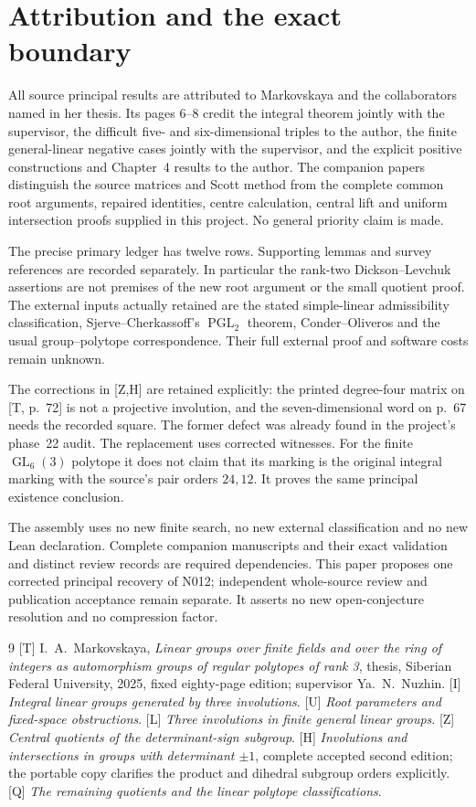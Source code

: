 \documentclass[11pt,a4paper]{article}
\newcommand{\GL}{\operatorname{GL}}
\newcommand{\PGL}{\operatorname{PGL}}
\begin{document}
\section{Attribution and the exact boundary}
All source principal results are attributed to Markovskaya and the
collaborators named in her thesis. Its pages 6--8 credit the integral
theorem jointly with the supervisor, the difficult five- and
six-dimensional triples to the author, the finite general-linear
negative cases jointly with the supervisor, and the explicit
positive constructions and Chapter~4 results to the author.
The companion papers distinguish the source matrices and Scott
method from the complete common root arguments, repaired identities,
centre calculation, central lift and uniform intersection proofs
supplied in this project. No general priority claim is made.

The precise primary ledger has twelve rows. Supporting lemmas and
survey references are recorded separately. In particular the
rank-two Dickson--Levchuk assertions are not premises of the new
root argument or the small quotient proof. The external inputs
actually retained are the stated simple-linear admissibility
classification, Sjerve--Cherkassoff's $\PGL_2$ theorem,
Conder--Oliveros and the usual group--polytope correspondence.
Their full external proof and software costs remain unknown.

The corrections in [Z,H] are retained explicitly: the printed
degree-four matrix on [T, p.~72] is not a projective involution,
and the seven-dimensional word on p.~67 needs the recorded square.
The former defect was already found in the project's phase~22
audit. The replacement uses corrected witnesses. For the finite
$\GL_6(3)$ polytope it does not claim that its marking is the
original integral marking with the source's pair orders $24,12$.
It proves the same principal existence conclusion.

The assembly uses no new finite search, no new external
classification and no new Lean declaration. Complete companion
manuscripts and their exact validation and distinct review records
are required dependencies. This paper proposes one corrected
principal recovery of N012; independent whole-source review and
publication acceptance remain separate. It asserts no new
open-conjecture resolution and no compression factor.

\begin{thebibliography}{9}\small
{}[T] I.~A.~Markovskaya, \emph{Linear groups over finite
fields and over the ring of integers as automorphism groups of
regular polytopes of rank 3}, thesis, Siberian Federal University,
2025, fixed eighty-page edition; supervisor Ya.~N.~Nuzhin.
[I] \emph{Integral linear groups generated by three involutions}.
[U] \emph{Root parameters and fixed-space obstructions}.
[L] \emph{Three involutions in finite general linear groups}.
[Z] \emph{Central quotients of the determinant-sign subgroup}.
[H] \emph{Involutions and intersections in groups with
determinant $\pm1$}, complete accepted second edition; the portable
copy clarifies the product and dihedral subgroup orders explicitly.
[Q] \emph{The remaining quotients and the linear polytope
classifications}.
\end{thebibliography}
\end{document}
